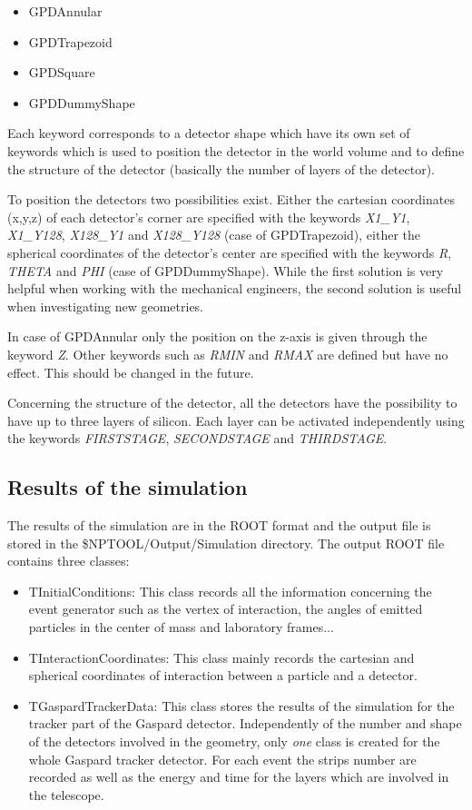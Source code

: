\documentclass[a4paper,12pt]{article}
\begin{document}
\begin{itemize}
   \item {GPDAnnular}
   \item {GPDTrapezoid}
   \item {GPDSquare}
   \item {GPDDummyShape}
\end{itemize}

Each keyword corresponds to a detector shape which have its own set of
keywords which is used to position the detector in the world volume
and to define the structure of the detector (basically the number of 
layers of the detector).

To position the detectors two possibilities exist. Either the cartesian 
coordinates (x,y,z) of each detector's corner are specified with the 
keywords {\it X1\_Y1}, {\it X1\_Y128}, {\it X128\_Y1} and {\it X128\_Y128}
(case of GPDTrapezoid), either the spherical coordinates of the detector's 
center are specified with the keywords {\it R}, {\it THETA} and {\it PHI} 
(case of GPDDummyShape). While the first solution is very helpful when 
working with the mechanical engineers, the second solution is useful when 
investigating new geometries.

In case of GPDAnnular only the position on the z-axis is given through
the keyword {\it Z}. Other keywords such as {\it RMIN} and {\it RMAX} 
are defined but have no effect. This should be changed in the future.

Concerning the structure of the detector, all the detectors have the 
possibility to have up to three layers of silicon. Each layer can be 
activated independently using the keywords {\it FIRSTSTAGE}, 
{\it SECONDSTAGE} and {\it THIRDSTAGE}. 


\subsection{Results of the simulation}
The results of the simulation are in the ROOT format and the output file 
is stored in the \$NPTOOL/Output/Simulation directory. The output ROOT file 
contains three classes:
\begin{itemize}
   \item {TInitialConditions:}
      This class records all the information concerning the event generator
      such as the vertex of interaction, the angles of emitted particles in 
      the center of mass and laboratory frames...
   \item {TInteractionCoordinates:}
      This class mainly records the cartesian and spherical coordinates of 
      interaction between a particle and a detector.
   \item {TGaspardTrackerData:}
      This class stores the results of the simulation for the tracker part 
      of the Gaspard detector. Independently of the number and shape of the 
      detectors involved in the geometry, only {\it one} class is created for 
      the whole Gaspard tracker detector. For each event the strips number 
      are recorded as well as the energy and time for the layers which are 
      involved in the telescope.
\end{itemize}
\end{document}
